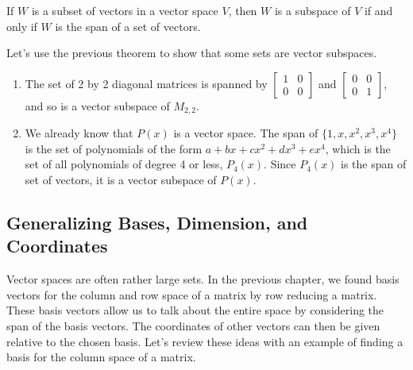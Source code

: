 \begin{theorem}\label{thm subspace iff span}
If $W$ is a subset of vectors in a vector space $V$, then $W$ is a subspace of $V$ if and only if $W$ is the span of a set of vectors.
\end{theorem}


\begin{example}
Let's use the previous theorem to show that some sets are vector subspaces. 
\begin{enumerate}
	\item The set of 2 by 2 diagonal matrices is spanned by 
	$\begin{bmatrix}1&0\\0&0\end{bmatrix}$ and $\begin{bmatrix}0&0\\0&1\end{bmatrix}$, and so is a vector subspace of $M_{2,2}$.
	\item We already know that $P(x)$ is a vector space. The span of $\{1,x,x^2,x^3,x^4\}$ is the set of polynomials of the form $a+bx+cx^2+dx^3+ex^4$, which is the set of all polynomials of degree 4 or less, $P_4(x)$. Since $P_4(x)$ is the span of set of vectors, it is a vector subspace of $P(x)$. 
\end{enumerate}
\end{example}



\subsection{Generalizing Bases, Dimension, and Coordinates}
Vector spaces are often rather large sets. In the previous chapter, we found basis vectors for the column and row space of a matrix by row reducing a matrix. These basis vectors allow us to talk about the entire space by considering the span of the basis vectors. The coordinates of other vectors can then be given relative to the chosen basis. Let's review these ideas with an example of finding a basis for the column space of a matrix.

